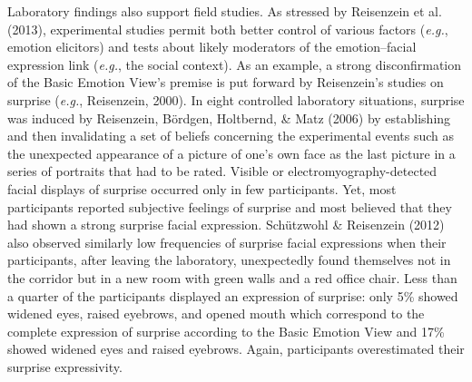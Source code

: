 \documentclass[
  english,
  doc]{apa7}
\begin{document}
Laboratory findings also support field studies. As stressed by Reisenzein et al. (2013), experimental studies permit both better control of various factors (\emph{e.g.}, emotion elicitors) and tests about likely moderators of the emotion--facial expression link (\emph{e.g.}, the social context). As an example, a strong disconfirmation of the Basic Emotion View's premise is put forward by Reisenzein's studies on surprise (\emph{e.g.}, Reisenzein, 2000). In eight controlled laboratory situations, surprise was induced by Reisenzein, Bördgen, Holtbernd, \& Matz (2006) by establishing and then invalidating a set of beliefs concerning the experimental events such as the unexpected appearance of a picture of one's own face as the last picture in a series of portraits that had to be rated. Visible or electromyography-detected facial displays of surprise occurred only in few participants. Yet, most participants reported subjective feelings of surprise and most believed that they had shown a strong surprise facial expression. Schützwohl \& Reisenzein (2012) also observed similarly low frequencies of surprise facial expressions when their participants, after leaving the laboratory, unexpectedly found themselves not in the corridor but in a new room with green walls and a red office chair. Less than a quarter of the participants displayed an expression of surprise: only 5\% showed widened eyes, raised eyebrows, and opened mouth which correspond to the complete expression of surprise according to the Basic Emotion View and 17\% showed widened eyes and raised eyebrows. Again, participants overestimated their surprise expressivity.
\end{document}
